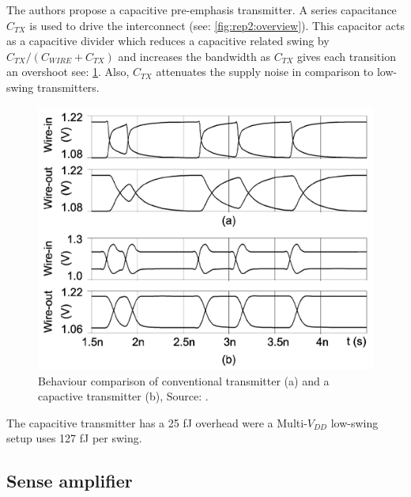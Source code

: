 The authors propose a capacitive pre-emphasis transmitter. 
A series capacitance $C_{TX}$ is used to drive the interconnect (see: \cref{fig:rep2:overview}). 
This capacitor acts as a capacitive divider which reduces a capacitive related swing by $C_{TX} / ( C_{WIRE} + C_{TX})$ and increases the bandwidth as $C_{TX}$ gives each transition an overshoot see: \cref{fig:rep2:capovershoot}.
Also, $C_{TX}$ attenuates the supply noise in comparison to low-swing transmitters.

\begin{figure}	\centering
	
	\includegraphics[width=0.8\linewidth]{Figures/Rep2TransmitterCap.png}
	\caption{Behaviour comparison of conventional transmitter (a) and a capactive transmitter (b), Source: \cite{schinkel2009low}.} 
    \label{fig:rep2:capovershoot}
\end{figure}

The capacitive transmitter has a 25 fJ overhead were a Multi-$V_{DD}$ low-swing setup uses 127 fJ per swing.



\subsection{Sense amplifier} \label{sss:rep2:senseamp} %

